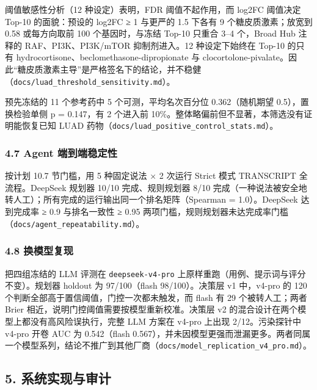\documentclass[
  10pt,
]{ctexart}
\begin{document}
阈值敏感性分析（12 种设定）表明，FDR 阈值不起作用，而
\textbar log2FC\textbar{} 阈值决定 Top-10 的面貌：预设的
\textbar log2FC\textbar{} ≥ 1 与更严的 1.5 下各有 9 个糖皮质激素；放宽到
0.58 或每方向取前 100 个基因时，与冻结 Top-10 只重合 3--4 个，Broad Hub
注释的 RAF、PI3K、PI3K/mTOR 抑制剂进入。12 种设定下始终在 Top-10 的只有
hydrocortisone、beclomethasone-dipropionate 与
clocortolone-pivalate。因此``糖皮质激素主导''是严格签名下的结论，并不稳健（\texttt{docs/\allowbreak{}luad\_\allowbreak{}threshold\_\allowbreak{}sensitivity.\allowbreak{}md}）。

预先冻结的 11 个参考药中 5 个可测，平均名次百分位 0.362（随机期望
0.5），置换检验单侧 p = 0.147，有 2 个进入前
10\%。整体略偏前但不显著，本筛选没有证明能恢复已知 LUAD
药物（\texttt{docs/\allowbreak{}luad\_\allowbreak{}positive\_\allowbreak{}control\_\allowbreak{}stats.\allowbreak{}md}）。

\subsubsection{4.7 Agent
端到端稳定性}\label{47-agent-ux7aefux5230ux7aefux7a33ux5b9aux6027}

按计划 10.7 节门槛，用 5 种固定说法 × 2 次运行 Strict 模式 TRANSCRIPT
全流程。DeepSeek 规划器 10/10 完成、规则规划器 8/10
完成（一种说法被安全地转人工）；所有完成的运行输出同一个排名矩阵（Spearman
= 1.0）。DeepSeek 达到完成率 ≥ 0.9 与排名一致性 ≥ 0.95
两项门槛，规则规划器未达完成率门槛（\texttt{docs/\allowbreak{}agent\_\allowbreak{}repeatability.\allowbreak{}md}）。

\subsubsection{4.8 换模型复现}\label{48-ux6362ux6a21ux578bux590dux73b0}

把四组冻结的 LLM 评测在 \texttt{deepseek-v4-pro}
上原样重跑（用例、提示词与评分不变）。规划器 holdout 为 97/100（flash
98/100）。决策层 v1 中，v4-pro 的 120
个判断全部高于置信阈值，门控一次都未触发，而 flash 有 29
个被转人工；两者 Brier 相近，说明门控阈值需要按模型重新校准。决策层 v2
的混合设计在两个模型上都没有高风险误执行，完整 LLM 方案在 v4-pro 上出现
2/12。污染探针中 v4-pro 开卷 AUC 为 0.542（flash
0.567），并未因模型更强而泄漏更多。两者同属一个模型系列，结论不推广到其他厂商（\texttt{docs/\allowbreak{}model\_\allowbreak{}replication\_\allowbreak{}v4\_\allowbreak{}pro.\allowbreak{}md}）。

\subsection{5.
系统实现与审计}\label{5-ux7cfbux7edfux5b9eux73b0ux4e0eux5ba1ux8ba1}
\end{document}
